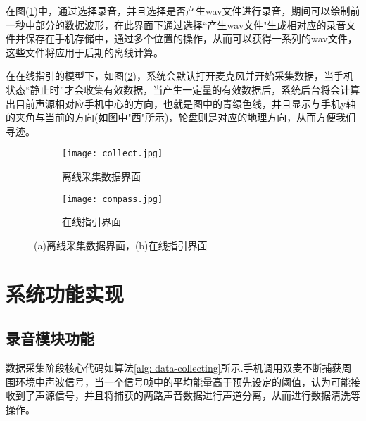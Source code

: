 \documentclass[winfonts,oneside]{njuthesis}
\begin{document}
			在图(\ref{fig: UI21})中，通过选择录音，并且选择是否产生wav文件进行录音，期间可以绘制前一秒中部分的数据波形，在此界面下通过选择“产生wav文件"生成相对应的录音文件并保存在手机存储中，通过多个位置的操作，从而可以获得一系列的wav文件，这些文件将应用于后期的离线计算。
			
			在在线指引的模型下，如图(\ref{fig: UI22})，系统会默认打开麦克风并开始采集数据，当手机状态“静止时”才会收集有效数据，当产生一定量的有效数据后，系统后台将会计算出目前声源相对应手机中心的方向，也就是图中的青绿色线，并且显示与手机y轴的夹角与当前的方向(如图中"西"所示)，轮盘则是对应的地理方向，从而方便我们寻迹。
			
			
			\begin{figure}[H]
				\centering
				\begin{subfigure}{.4\textwidth}
					\centering
					\texttt{[image: collect.jpg]}
					\caption{离线采集数据界面}
					\label{fig: UI21}
				\end{subfigure}
				\begin{subfigure}{.4\textwidth}
					\centering
					\texttt{[image: compass.jpg]}
					\caption{在线指引界面}
					\label{fig: UI22}
				\end{subfigure}
				\caption{(a)离线采集数据界面，(b)在线指引界面}
				\label{fig: UI2}
			\end{figure}
			
		
	\section{系统功能实现}
	
		\subsection{录音模块功能}
			数据采集阶段核心代码如算法\ref{alg: data-collecting}所示.手机调用双麦不断捕获周围环境中声波信号，当一个信号帧中的平均能量高于预先设定的阈值，认为可能接收到了声源信号，并且将捕获的两路声音数据进行声道分离，从而进行数据清洗等操作。
			
\end{document}
